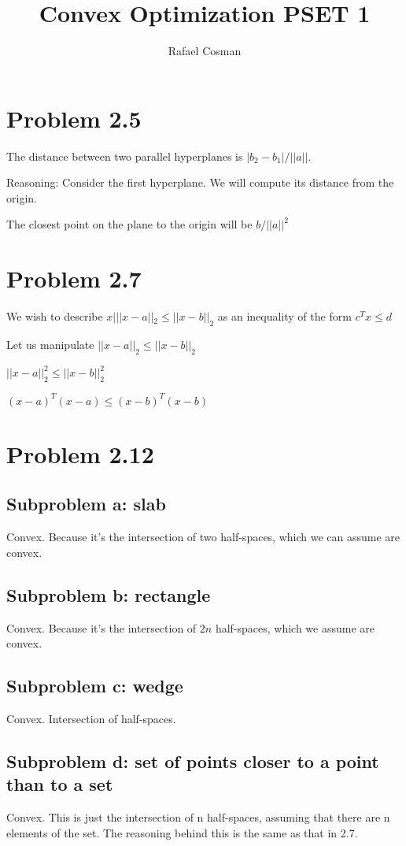 \documentclass[a4paper]{article}
\title{Convex Optimization PSET 1}
\author{Rafael Cosman}
\begin{document}
\maketitle

\section{Problem 2.5}
The distance between two parallel hyperplanes is $|b_{2} - b_{1}| / ||a||$.

Reasoning:
Consider the first hyperplane. We will compute its distance from the origin.

The closest point on the plane to the origin will be $b/||a||^2$

\section{Problem 2.7}
We wish to describe $x| ||x-a||_2\leq||x-b||_2$ as an inequality of the form $c^Tx \leq d$

Let us manipulate $||x-a||_2 \leq ||x-b||_2$

$||x-a||_2^2 \leq ||x-b||_2^2$

$(x-a)^T(x-a) \leq (x-b)^T(x-b)$

\section{Problem 2.12}
\subsection{Subproblem a: slab}
Convex. Because it’s the intersection of two half-spaces, which we can assume are convex.
\subsection{Subproblem b: rectangle}
Convex. Because it’s the intersection of $2n$ half-spaces, which we assume are convex.
\subsection{Subproblem c: wedge}
Convex. Intersection of half-spaces.
\subsection{Subproblem d: set of points closer to a point than to a set}
Convex. This is just the intersection of n half-spaces, assuming that there are n elements of the set. The reasoning behind this is the same as that in 2.7.
\end{document}
